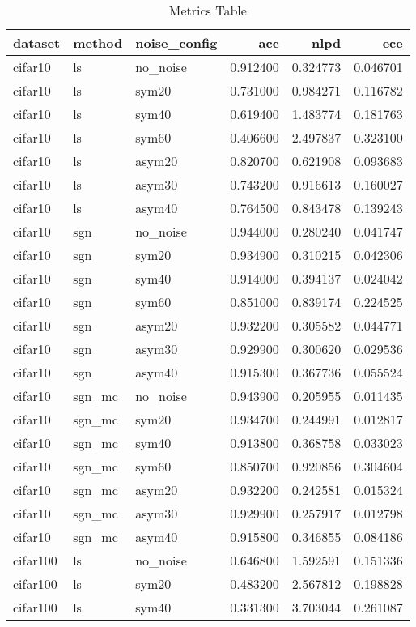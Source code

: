 \begin{table}
\caption{Metrics Table}
\label{tab:metrics}
\begin{tabular}{lllrrr}
\toprule
dataset & method & noise_config & acc & nlpd & ece \\
\midrule
cifar10 & ls & no_noise & 0.912400 & 0.324773 & 0.046701 \\
cifar10 & ls & sym20 & 0.731000 & 0.984271 & 0.116782 \\
cifar10 & ls & sym40 & 0.619400 & 1.483774 & 0.181763 \\
cifar10 & ls & sym60 & 0.406600 & 2.497837 & 0.323100 \\
cifar10 & ls & asym20 & 0.820700 & 0.621908 & 0.093683 \\
cifar10 & ls & asym30 & 0.743200 & 0.916613 & 0.160027 \\
cifar10 & ls & asym40 & 0.764500 & 0.843478 & 0.139243 \\
cifar10 & sgn & no_noise & 0.944000 & 0.280240 & 0.041747 \\
cifar10 & sgn & sym20 & 0.934900 & 0.310215 & 0.042306 \\
cifar10 & sgn & sym40 & 0.914000 & 0.394137 & 0.024042 \\
cifar10 & sgn & sym60 & 0.851000 & 0.839174 & 0.224525 \\
cifar10 & sgn & asym20 & 0.932200 & 0.305582 & 0.044771 \\
cifar10 & sgn & asym30 & 0.929900 & 0.300620 & 0.029536 \\
cifar10 & sgn & asym40 & 0.915300 & 0.367736 & 0.055524 \\
cifar10 & sgn_mc & no_noise & 0.943900 & 0.205955 & 0.011435 \\
cifar10 & sgn_mc & sym20 & 0.934700 & 0.244991 & 0.012817 \\
cifar10 & sgn_mc & sym40 & 0.913800 & 0.368758 & 0.033023 \\
cifar10 & sgn_mc & sym60 & 0.850700 & 0.920856 & 0.304604 \\
cifar10 & sgn_mc & asym20 & 0.932200 & 0.242581 & 0.015324 \\
cifar10 & sgn_mc & asym30 & 0.929900 & 0.257917 & 0.012798 \\
cifar10 & sgn_mc & asym40 & 0.915800 & 0.346855 & 0.084186 \\
cifar100 & ls & no_noise & 0.646800 & 1.592591 & 0.151336 \\
cifar100 & ls & sym20 & 0.483200 & 2.567812 & 0.198828 \\
cifar100 & ls & sym40 & 0.331300 & 3.703044 & 0.261087 \\

\end{tabular}
\end{table}
